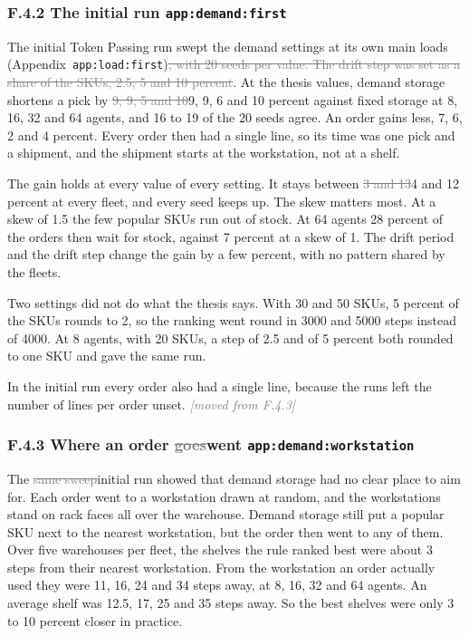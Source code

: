 \documentclass[11pt,a4paper]{article}
\newcommand{\new}[1]{\textcolor{newc}{#1}}
\newcommand{\old}[1]{\textcolor{gray}{\sout{#1}}}
\newcommand{\lref}[1]{{\small\texttt{#1}}}
\newcommand{\moved}[1]{{\small\textcolor{gray}{\emph{[moved from #1]}}}}
\begin{document}
\subsubsection*{\new{F.4.2 The initial run} \hfill\new{\lref{app:demand:first}}}

The initial Token Passing run swept the demand settings at its own main loads
(Appendix~\lref{app:load:first})\old{, with 20 seeds per value. The drift
step was set as a share of the SKUs, 2.5, 5 and 10 percent}. At the thesis
values, demand storage shortens a pick by \old{9, 9, 5 and 10}\new{9, 9, 6
and 10} percent against fixed storage at 8, 16, 32 and 64 agents, and 16 to
19 of the 20 seeds agree.
\new{An order gains less, 7, 6, 2 and 4 percent. Every order then had a
single line, so its time was one pick and a shipment, and the shipment starts
at the workstation, not at a shelf.}

The gain holds at every value of every setting. It stays between \old{3 and
13}\new{4 and 12} percent at every fleet, and every seed keeps up. The skew
matters most. At a skew of 1.5 the few popular SKUs run out of stock. At 64
agents 28 percent of the orders then wait for stock, against 7 percent at a
skew of 1. The drift period and the drift step change the gain by a few
percent, with no pattern shared by the fleets.

Two settings did not do what the thesis says. With 30 and 50 SKUs, 5 percent
of the SKUs rounds to 2, so the ranking went round in 3000 and 5000 steps
instead of 4000. At 8 agents, with 20 SKUs, a step of 2.5 and of 5 percent
both rounded to one SKU and gave the same run.

In the initial run every order also had a single line, because the runs left
the number of lines per order unset. \moved{F.4.3}

\subsubsection*{F.4.3 Where an order \old{goes}\new{went} \hfill\lref{app:demand:workstation}}

The \old{same sweep}\new{initial run} showed that demand storage had no clear
place to aim for. Each order went to a workstation drawn at random, and the
workstations stand on rack faces all over the warehouse. Demand storage still
put a popular SKU next to the nearest workstation, but the order then went to
any of them. Over five warehouses per fleet, the shelves the rule ranked best
were about 3 steps from their nearest workstation. From the workstation an
order actually used they were 11, 16, 24 and 34 steps away, at 8, 16, 32 and
64 agents. An average shelf was 12.5, 17, 25 and 35 steps away. So the best
shelves were only 3 to 10 percent closer in practice.
\end{document}
